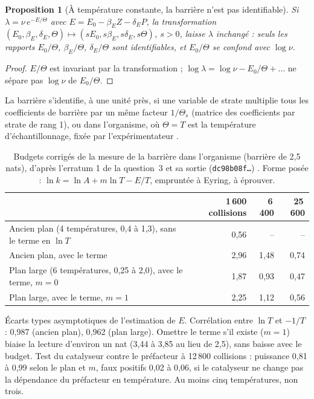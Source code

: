 \documentclass[11pt,a4paper]{article}
\theoremstyle{definition}
\theoremstyle{plain}
\newtheorem{proposition}[definition]{Proposition}
\begin{document}
\begin{proposition}[À température constante, la barrière n'est pas identifiable]
\label{prop:identif}
Si $\lambda=\nu\,e^{-E/\Theta}$ avec $E=E_0-\beta_EZ-\delta_EP$, la transformation
$(E_0,\beta_E,\delta_E,\Theta)\mapsto(sE_0,s\beta_E,s\delta_E,s\Theta)$, $s>0$, laisse $\lambda$
inchangé : seuls les rapports $E_0/\Theta$, $\beta_E/\Theta$, $\delta_E/\Theta$ sont identifiables, et
$E_0/\Theta$ se confond avec $\log\nu$.
\end{proposition}
\begin{proof}
$E/\Theta$ est invariant par la transformation ; $\log\lambda=\log\nu-E_0/\Theta+\dots$ ne sépare pas
$\log\nu$ de $E_0/\Theta$.
\end{proof}
La barrière s'identifie, à une unité près, si une variable de strate multiplie tous les
coefficients de barrière par un même facteur $1/\Theta_s$ (matrice des coefficients par strate de
rang 1), ou dans l'organisme, où $\Theta=T$ est la température d'échantillonnage, fixée par
l'expérimentateur \cite[section~3]{q3}.

\begin{table}[ht]
\centering\small
\caption{Budgets corrigés de la mesure de la barrière dans l'organisme (barrière de 2,5 nats),
d'après l'erratum 1 de la question~3 et sa sortie (\texttt{dc98b08f…}) \cite{erratumq3}. Forme
posée : $\ln k=\ln A+m\ln T-E/T$, empruntée à Eyring, à éprouver.}
\label{tab:budgets}
\begin{tabular}{@{}lrrr@{}}
\toprule
 & 1\,600 collisions & 6\,400 & 25\,600 \\
\midrule
Ancien plan (4 températures, 0,4 à 1,3), sans le terme en $\ln T$ & 0,56 & -- & -- \\
Ancien plan, avec le terme & 2,96 & 1,48 & 0,74 \\
Plan large (6 températures, 0,25 à 2,0), avec le terme, $m=0$ & 1,87 & 0,93 & 0,47 \\
Plan large, avec le terme, $m=1$ & 2,25 & 1,12 & 0,56 \\
\bottomrule
\end{tabular}
\par\smallskip
\begin{minipage}{0.92\textwidth}\footnotesize
Écarts types asymptotiques de l'estimation de $E$. Corrélation entre $\ln T$ et $-1/T$ : 0,987
(ancien plan), 0,962 (plan large). Omettre le terme s'il existe ($m=1$) biaise la lecture d'environ un
nat (3,44 à 3,85 au lieu de 2,5), sans baisse avec le budget. Test du catalyseur contre le
préfacteur à 12\,800 collisions : puissance 0,81 à 0,99 selon le plan et $m$, faux positifs 0,02 à
0,06, si le catalyseur ne change pas la dépendance du préfacteur en température. Au moins cinq
températures, non trois.
\end{minipage}
\end{table}
\end{document}
